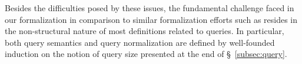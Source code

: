 Besides the difficulties posed by these issues, the fundamental challenge faced in our formalization in comparison to similar formalization efforts such as \cite{qcert, vesqlsemantics, certifdatalog} resides in the non-structural nature of most definitions related to queries. In particular, both query semantics and query normalization are defined by well-founded induction on the notion of query size presented at the end of \S~\ref{subsec:query}. 

 




